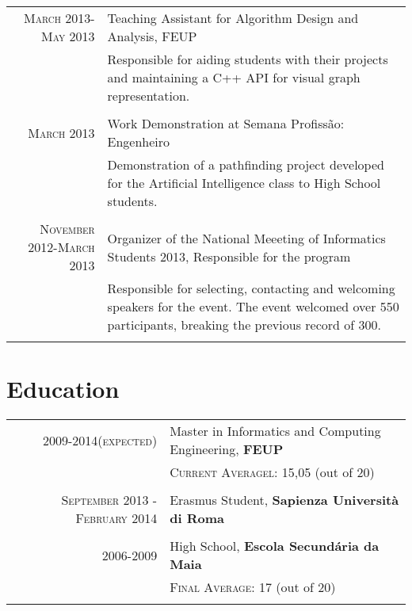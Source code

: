 \documentclass[a4paper,10pt]{article} %
\begin{document}
\begin{tabular}{r|p{11cm}}
\textsc{March 2013-May 2013} & Teaching Assistant for Algorithm Design and Analysis, FEUP\\
& \footnotesize{Responsible for aiding students with their projects and maintaining a C++ API for visual graph representation.}\\
\multicolumn{2}{c}{} \\


\textsc{March 2013} & Work Demonstration at Semana Profissão: Engenheiro\\
& \footnotesize{Demonstration of a pathfinding project developed for the Artificial Intelligence class to High School students.}\\
\multicolumn{2}{c}{} \\


\textsc{November 2012-March 2013} & Organizer of the National Meeeting of Informatics Students 2013, Responsible for the program\\
& \footnotesize{Responsible for selecting, contacting and welcoming speakers for the event. The event welcomed over 550 participants, breaking the previous record of 300.}\\
\multicolumn{2}{c}{} \\
\end{tabular}


\section{Education}

\begin{tabular}{rl}	
\textsc{2009-2014(expected)} & Master in Informatics and Computing Engineering, \textbf{FEUP}\\
&\normalsize \textsc{Current Averagel}: 15,05 (out of 20)\\
&\\

\textsc{September 2013 - February 2014} & Erasmus Student, \textbf{Sapienza Università di Roma}\\
&\\


\textsc{2006-2009} & High School, \textbf{Escola Secundária da Maia}\\
&\normalsize \textsc{Final Average}: 17 (out of 20)\\
&\\
\end{tabular}
\end{document}
